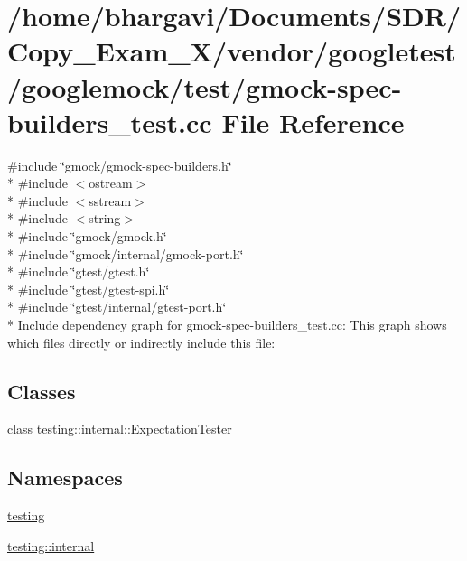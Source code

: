 \hypertarget{gmock-spec-builders__test_8cc}{}\section{/home/bhargavi/\+Documents/\+S\+D\+R/\+Copy\+\_\+\+Exam\+\_\+X/vendor/googletest/googlemock/test/gmock-\/spec-\/builders\+\_\+test.cc File Reference}
\label{gmock-spec-builders__test_8cc}
{\ttfamily \#include \char`\"{}gmock/gmock-\/spec-\/builders.\+h\char`\"{}}\\*
{\ttfamily \#include $<$ostream$>$}\\*
{\ttfamily \#include $<$sstream$>$}\\*
{\ttfamily \#include $<$string$>$}\\*
{\ttfamily \#include \char`\"{}gmock/gmock.\+h\char`\"{}}\\*
{\ttfamily \#include \char`\"{}gmock/internal/gmock-\/port.\+h\char`\"{}}\\*
{\ttfamily \#include \char`\"{}gtest/gtest.\+h\char`\"{}}\\*
{\ttfamily \#include \char`\"{}gtest/gtest-\/spi.\+h\char`\"{}}\\*
{\ttfamily \#include \char`\"{}gtest/internal/gtest-\/port.\+h\char`\"{}}\\*
Include dependency graph for gmock-\/spec-\/builders\+\_\+test.cc\+:
This graph shows which files directly or indirectly include this file\+:
\subsection*{Classes}
\begin{DoxyCompactItemize}
\item 
class \hyperlink{classtesting_1_1internal_1_1_expectation_tester}{testing\+::internal\+::\+Expectation\+Tester}
\end{DoxyCompactItemize}
\subsection*{Namespaces}
\begin{DoxyCompactItemize}
\item 
 \hyperlink{namespacetesting}{testing}
\item 
 \hyperlink{namespacetesting_1_1internal}{testing\+::internal}
\end{DoxyCompactItemize}
